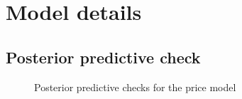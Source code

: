 \documentclass[
  letterpaper,
  DIV=11,
  numbers=noendperiod]{scrartcl}
\begin{document}
\section{Model details}\label{sec-model-details}

\subsection{Posterior predictive
check}\label{posterior-predictive-check}

\begin{figure}


\caption{\label{fig-post-pred}Posterior predictive checks for the price
model}

\end{figure}%
\end{document}
